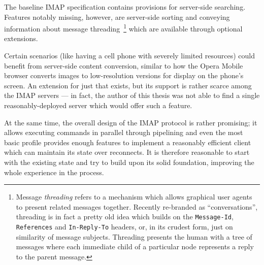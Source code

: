 \documentclass[trojita]{subfiles}
\begin{document}
The baseline IMAP specification contains provisions for server-side searching.  Features notably missing, however, are
server-side sorting and conveying information about message threading~\footnote{Message {\em threading} refers to a
mechanism which allows graphical user agents to present related messages together.  Recently re-branded as
``conversations'', threading is in fact a pretty old idea which builds on the {\tt Message-Id}, {\tt References} and
{\tt In-Reply-To} headers, or, in its crudest form, just on similarity of message subjects.  Threading presents the
human with a tree of messages where each immediate child of a particular node represents a reply to the parent message.}
which are available through optional extensions.

Certain scenarios (like having a cell phone with severely limited resources) could benefit from server-side content
conversion, similar to how the Opera Mobile browser converts images to low-resolution versions for display on the
phone's screen.  An extension for just that exists, but its support is rather scarce among the IMAP servers --- in fact,
the author of this thesis was not able to find a single reasonably-deployed server which would offer such a feature.

At the same time, the overall design of the IMAP protocol is rather promising; it allows executing commands in
parallel through pipelining and even the most basic profile provides enough features to implement a reasonably efficient
client which can maintain its state over reconnects.  It is therefore reasonable to start with the existing state and
try to build upon its solid foundation, improving the whole experience in the process.
\end{document}
